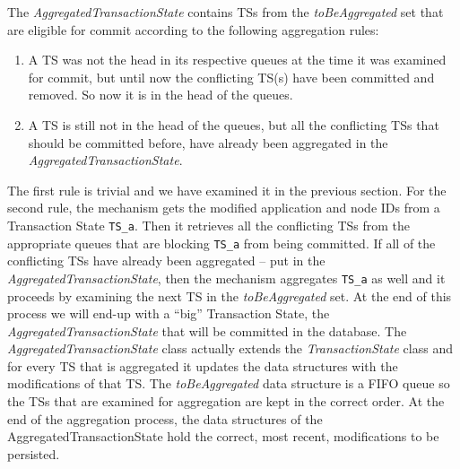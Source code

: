 The \emph{AggregatedTransactionState} contains TSs from the
\emph{toBeAggregated} set that are eligible for commit according to the
following aggregation rules:
\begin{enumerate}
  \item A TS was not the head in its respective queues at the time it
    was examined for commit, but until now the conflicting TS(s) have
    been committed and removed. So now it is in the head of the
    queues.

  \item A TS is still not in the head of the queues, but all the
    conflicting TSs that should be committed before, have already been
    aggregated in the \emph{AggregatedTransactionState}.
\end{enumerate}

The first rule is trivial and we have examined it in the previous
section. For the second rule, the mechanism gets the modified
application and node IDs from a Transaction State \texttt{TS\_a}.
Then it retrieves all the conflicting TSs from the appropriate queues
that are blocking \texttt{TS\_a} from being committed. If all of the
conflicting TSs have already been aggregated -- put in the
\emph{AggregatedTransactionState}, then the mechanism aggregates
\texttt{TS\_a} as well and it proceeds by examining the next TS in the
\emph{toBeAggregated} set. At the end of this process we will end-up
with a ``big'' Transaction State, the
\emph{AggregatedTransactionState} that will be committed in the
database. The \emph{AggregatedTransactionState} class actually extends
the \emph{TransactionState} class and for every TS that is aggregated
it updates the data structures with the modifications of that TS. The
\emph{toBeAggregated} data structure is a FIFO queue so the TSs that
are examined for aggregation are kept in the correct order. At the
end of the aggregation process, the data structures of the
AggregatedTransactionState hold the correct, most recent, modifications to be persisted.

